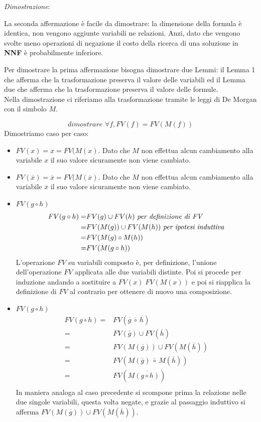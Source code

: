 \documentclass[a4paper]{article}
\newenvironment{dimostrazione}{\textit{Dimostrazione}:\begin{adjustwidth}{1cm}{}}{\end{adjustwidth}}
\begin{document}
\begin{dimostrazione}
	La seconda affermazione è facile da dimostrare: la dimensione della formula è identica, non vengono aggiunte variabili ne relazioni.
	Anzi, dato che vengono svolte meno operazioni di negazione il costo della ricerca di una soluzione in \textbf{NNF} è probabilmente inferiore.

	Per dimostrare la prima affermazione bisogna dimostrare due Lemmi:
	il Lemma 1 che afferma che la trasformazione preserva il valore delle variabili ed il Lemma due che afferma che la trasformazione preserva il valore delle formule.\\
	Nella dimostrazione ci riferiamo alla trasformazione tramite le leggi di De Morgan con il simbolo $M$.

	$$\textit{dimostrare } \forall f, FV(f) = FV(M(f)) $$
	Dimostriamo caso per caso:
	\begin{itemize}
	\item $FV(x) = x = FV(M(x)$. Dato che $M$ non effettua alcun cambiamento alla variabile $x$ il suo valore sicuramente non viene cambiato.
	\item $FV(\overline x) = \overline x = FV(M(\overline x)$. Dato che $M$ non effettua alcun cambiamento alla variabile $\overline x$ il suo valore sicuramente non viene cambiato.
	\item $FV(g \circ h)$ 
		\begin{align*}
		FV(g \circ h) =& FV(g) \cup FV(h) \text{  \textit{per definizione di FV}}\\
			=& FV(M(g)) \cup FV(M(h)) \text{  \textit{per ipotesi induttiva}}\\
			=& FV(M(g) \circ M(h))\\
			=& FV(M(g \circ h))\\
		\end{align*}
		L'operazione $FV$ su variabili composto è, per definizione, l'unione dell'operazione $FV$ applicata alle due variabili distinte.
		Poi si procede per induzione andando a sostituire a $FV(x) \; FV(M(x))$ e poi si riapplica la definizione di $FV$ al contrario per ottenere di nuovo una composizione. 
	\item $FV(g \circ h)$
                \begin{align*}
			FV(g \circ h) =& FV(\overline g \: \overline \circ \: \overline h)\\
			=& FV(\overline g) \cup FV(\overline h)\\
                        =& FV(M(\overline g)) \cup FV(M(\overline h))\\
                        =& FV(M(\overline g) \: \overline \circ \: M( \overline h))\\
			=& FV(M \overline{(g \circ h)})\\
                \end{align*}
		In maniera analoga al caso precedente si scompone prima la relazione nelle due singole variabili, questa volta negate, e grazie al passaggio induttivo si afferma $FV(M(\overline g)) \cup FV(M(\overline h))$.
	\end{itemize}



\end{dimostrazione}
\end{document}
